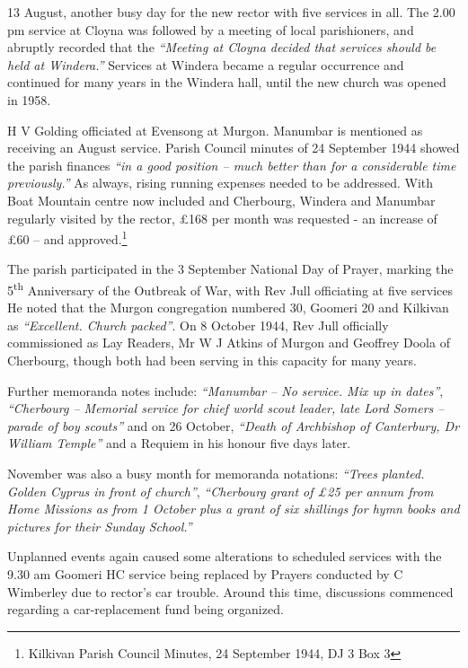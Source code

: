 13 August, another busy day for the new rector with five services in all. The 2.00 pm service at Cloyna was followed by a meeting of local parishioners, and abruptly recorded that the \emph{``Meeting at Cloyna decided that services should be held at Windera.''} Services at Windera became a regular occurrence and continued for many years in the Windera hall, until the new church was opened in 1958.



H V Golding officiated at Evensong at Murgon. Manumbar is mentioned as receiving an August service. Parish Council minutes of 24 September 1944 showed the parish finances \emph{``in a good position -- much better than for a considerable time previously.''} As always, rising running expenses needed to be addressed. With Boat Mountain centre now included and Cherbourg, Windera and Manumbar regularly visited by the rector, \pounds168 per month was requested - an increase of \pounds60 -- and approved.\footnote{Kilkivan Parish Council Minutes, 24 September 1944, DJ 3 Box 3}


The parish participated in the 3 September National Day of Prayer, marking the 5\textsuperscript{th} Anniversary of the Outbreak of War, with Rev Jull officiating at five services He noted that the Murgon congregation numbered 30, Goomeri 20 and Kilkivan as \emph{``Excellent. Church packed''}. On 8 October 1944, Rev Jull officially commissioned as Lay Readers, Mr W J Atkins of Murgon and Geoffrey Doola of Cherbourg, though both had been serving in this capacity for many years.



Further memoranda notes include: \emph{``Manumbar -- No service. Mix up in dates''}, \emph{``Cherbourg -- Memorial service for chief world scout leader, late Lord Somers -- parade of boy scouts''} and on 26 October, \emph{``Death of Archbishop of Canterbury, Dr William Temple''} and a Requiem in his honour five days later.



November was also a busy month for memoranda notations: \emph{``Trees planted. Golden Cyprus in front of church''}, \emph{``Cherbourg grant of \pounds25 per annum from Home Missions as from 1 October plus a grant of six shillings for hymn books and pictures for their Sunday School.''}



Unplanned events again caused some alterations to scheduled services with the 9.30 am Goomeri HC service being replaced by Prayers conducted by C Wimberley due to rector's car trouble. Around this time, discussions commenced regarding a car-replacement fund being organized.




